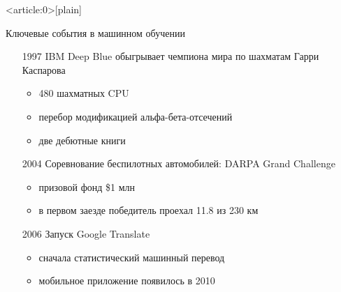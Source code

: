 \documentclass[fullscreen=true, bookmarks=true, hyperref={pdfencoding=unicode}]{beamer}
\begin{document}
{ %
    \begin{frame}<article:0>[plain]
     \end{frame}
}

\begin{frame}{Ключевые события в машинном обучении}
  \begin{itemize}
    \item[1997] IBM Deep Blue обыгрывает чемпиона мира по шахматам Гарри Каспарова
       \begin{itemize}
         \item 480 шахматных CPU
         \item перебор модификацией альфа-бета-отсечений
         \item две дебютные книги
       \end{itemize}

      \pause
      \item[2004] Соревнование беспилотных автомобилей: DARPA Grand Challenge
         \begin{itemize}
           \item призовой фонд \$1 млн
           \item в первом заезде победитель проехал 11.8 из 230 км
         \end{itemize}

      \pause
      \item[2006] Запуск Google Translate
         \begin{itemize}
           \item сначала статистический машинный перевод
           \item мобильное приложение появилось в 2010
         \end{itemize}
  \end{itemize}
\end{frame}
\end{document}
